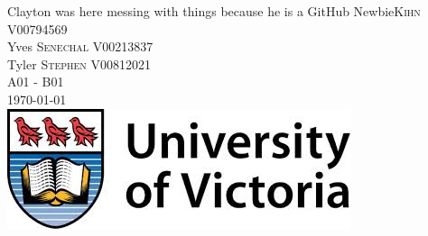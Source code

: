 \documentclass[12pt]{article}
\begin{document}
\begin{titlepage}
\Large Clayton was here messing with things because he is a GitHub Newbie\textsc{Kihn}
\large V00794569	\\
\Large Yves \textsc{Senechal}
\large V00213837	\\
\Large Tyler \textsc{Stephen}
\large V00812021	\\
A01 - B01\\[2.5cm] %


{\large \today}\\[3cm] %


\includegraphics[scale=0.3]{UVic_logo}\\ %
 

\vfill %

\end{titlepage}

\tableofcontents
\pagebreak
\end{document}
